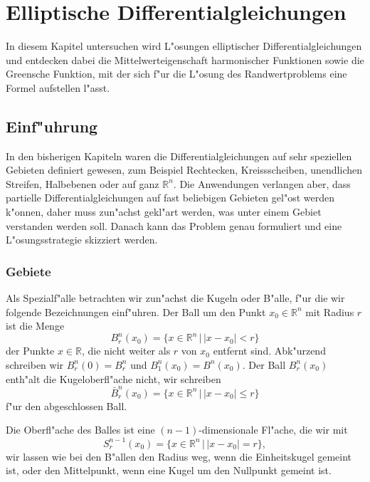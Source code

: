 %
%
%
\chapter{Elliptische Differentialgleichungen\label{chapter-elliptisch}}
In diesem Kapitel untersuchen wird L"osungen elliptischer Differentialgleichungen
und entdecken dabei die Mittelwerteigenschaft
harmonischer Funktionen sowie die Greensche Funktion, mit der sich f"ur
die L"osung des Randwertproblems eine Formel aufstellen l"asst.

\section{Einf"uhrung}
In den bisherigen Kapiteln waren die Differentialgleichungen auf sehr
speziellen Gebieten definiert gewesen, zum Beispiel Rechtecken, Kreissscheiben,
unendlichen Streifen, Halbebenen oder auf ganz $\mathbb R^n$. 
Die Anwendungen verlangen aber, dass partielle Differentialgleichungen
auf fast beliebigen Gebieten gel"ost werden k"onnen, daher muss
zun"achst gekl"art werden, was unter einem Gebiet verstanden werden
soll. Danach kann das Problem genau formuliert und eine L"osungsstrategie
skizziert werden.

\subsection{Gebiete}
Als Spezialf"alle betrachten wir zun"achst
die Kugeln oder B"alle, f"ur die 
wir folgende Bezeichnungen einf"uhren.
Der Ball um den Punkt $x_0\in\mathbb R^n$ mit Radius $r$ ist die Menge
\[
B_r^n(x_0)=\{x\in\mathbb R^n\,|\,|x-x_0|<r\}
\]
der Punkte $x\in\mathbb R$, die nicht weiter als $r$ von $x_0$ entfernt
sind.
Abk"urzend schreiben wir $B_r^n(0)=B_r^n$ und $B_1^n(x_0)=B^n(x_0)$.
Der Ball $B_r^n(x_0)$ enth"alt die Kugeloberfl"ache nicht,
wir schreiben
\[
\bar B_r^n(x_0)=\{x\in\mathbb R^n\,|\,|x-x_0|\le r\}
\]
f"ur den abgeschlossen Ball.

Die Oberfl"ache des Balles ist eine $(n-1)$-dimensionale
Fl"ache,
die wir mit
\[
S_r^{n-1}(x_0)=\{x\in\mathbb R^n\,|\,|x-x_0|=r\},
\]
wir lassen wie bei den B"allen den Radius weg, wenn die
Einheitskugel gemeint ist, oder den Mittelpunkt, wenn eine
Kugel um den Nullpunkt gemeint ist.

